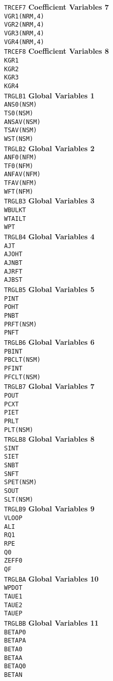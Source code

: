 \documentclass[11pt]{jarticle}
\newcommand{\commonBlock}[2]
{\texttt{#1} \> \> \> \textbf{#2} \\}
\newcommand{\commonVar}[3]
{\> \texttt{#1} \> [#2] \> #3 \\}
\begin{document}
\begin{tabbing}
\commonBlock{TRCEF7}{Coefficient Variables 7}
\commonVar{VGR1(NRM,4)}{D}{}
\commonVar{VGR2(NRM,4)}{D}{}
\commonVar{VGR3(NRM,4)}{D}{}
\commonVar{VGR4(NRM,4)}{D}{}

\commonBlock{TRCEF8}{Coefficient Variables 8}
\commonVar{KGR1}{K}{}
\commonVar{KGR2}{K}{}
\commonVar{KGR3}{K}{}
\commonVar{KGR4}{K}{}

\commonBlock{TRGLB1}{Global Variables 1}
\commonVar{ANS0(NSM)}{D}{}
\commonVar{TS0(NSM)}{D}{}
\commonVar{ANSAV(NSM)}{D}{}
\commonVar{TSAV(NSM)}{D}{}
\commonVar{WST(NSM)}{D}{}

\commonBlock{TRGLB2}{Global Variables 2}
\commonVar{ANF0(NFM)}{D}{}
\commonVar{TF0(NFM)}{D}{}
\commonVar{ANFAV(NFM)}{D}{}
\commonVar{TFAV(NFM)}{D}{}
\commonVar{WFT(NFM)}{D}{}

\commonBlock{TRGLB3}{Global Variables 3}
\commonVar{WBULKT}{D}{}
\commonVar{WTAILT}{D}{}
\commonVar{WPT}{D}{}

\commonBlock{TRGLB4}{Global Variables 4}
\commonVar{AJT}{D}{}
\commonVar{AJOHT}{D}{}
\commonVar{AJNBT}{D}{}
\commonVar{AJRFT}{D}{}
\commonVar{AJBST}{D}{}

\commonBlock{TRGLB5}{Global Variables 5}
\commonVar{PINT}{D}{}
\commonVar{POHT}{D}{}
\commonVar{PNBT}{D}{}
\commonVar{PRFT(NSM)}{D}{}
\commonVar{PNFT}{D}{}

\commonBlock{TRGLB6}{Global Variables 6}
\commonVar{PBINT}{D}{}
\commonVar{PBCLT(NSM)}{D}{}
\commonVar{PFINT}{D}{}
\commonVar{PFCLT(NSM)}{D}{}

\commonBlock{TRGLB7}{Global Variables 7}
\commonVar{POUT}{D}{}
\commonVar{PCXT}{D}{}
\commonVar{PIET}{D}{}
\commonVar{PRLT}{D}{}
\commonVar{PLT(NSM)}{D}{}

\commonBlock{TRGLB8}{Global Variables 8}
\commonVar{SINT}{D}{}
\commonVar{SIET}{D}{}
\commonVar{SNBT}{D}{}
\commonVar{SNFT}{D}{}
\commonVar{SPET(NSM)}{D}{}
\commonVar{SOUT}{D}{}
\commonVar{SLT(NSM)}{D}{}

\commonBlock{TRGLB9}{Global Variables 9}
\commonVar{VLOOP}{D}{}
\commonVar{ALI}{D}{}
\commonVar{RQ1}{D}{}
\commonVar{RPE}{D}{}
\commonVar{Q0}{D}{}
\commonVar{ZEFF0}{D}{}
\commonVar{QF}{D}{}

\commonBlock{TRGLBA}{Global Variables 10}
\commonVar{WPDOT}{D}{}
\commonVar{TAUE1}{D}{}
\commonVar{TAUE2}{D}{}
\commonVar{TAUEP}{D}{}

\commonBlock{TRGLBB}{Global Variables 11}
\commonVar{BETAP0}{D}{}
\commonVar{BETAPA}{D}{}
\commonVar{BETA0}{D}{}
\commonVar{BETAA}{D}{}
\commonVar{BETAQ0}{D}{}
\commonVar{BETAN}{D}{}


\end{tabbing}
\end{document}
